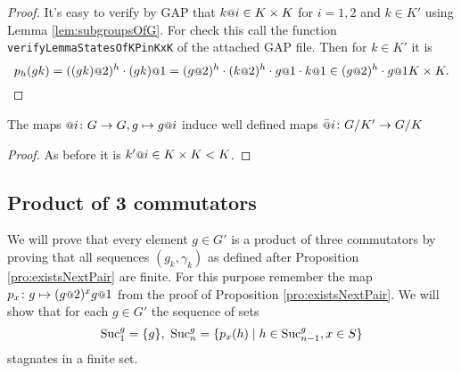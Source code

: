 \documentclass[a4paper,11pt]{amsart}
\begin{document}
\begin{proof}
 It's easy to verify by GAP that $k\at{i} \in K\times K$ for $i=1,2$ and $k\in K'$ using Lemma \ref{lem:subgroupsOfG}.
 For check this call the function \lstinline{verifyLemmaStatesOfKPinKxK} of the attached GAP file.
 Then for $k\in K'$ it is 
 \[p_h(gk) = ((gk)\at{2})^h\cdot (gk)\at{1} = (g\at{2})^h\cdot (k\at{2})^h\cdot g\at{1}\cdot k\at{1}\in (g\at{2})^h\cdot g\at{1}K\times K.\]
\end{proof}
\begin{lem} \label{lem:atIsWellDefinedModK'}
 The maps $\at{i}\colon G\to G, g\mapsto g\at{i}$ induce well defined maps $\att{i}\colon \RNK{G}{K'}\to\RNK{G}{K}$
\end{lem}
\begin{proof}
 As before it is $k'\at{i} \in K\times K < K$.
%  
%  
% 
\end{proof}
\subsection{Product of 3 commutators}
We will prove that every element $g\in G'$ is a product of three commutators by proving that all
sequences $(g_k,\gamma_k)$ as defined after Proposition \ref{pro:existsNextPair} are finite.
For this purpose remember the map $p_x\colon g \mapsto (g\at{2})^x g\at{1}$ from the proof of Proposition \ref{pro:existsNextPair}.
We will show that for each $g\in G'$ the sequence of sets 
\[\textup{Suc}_1^g=\{g\},\ \textup{Suc}_n^g = \{p_x(h) \mid h\in \textup{Suc}_{n-1}^g, x\in S\} \]
stagnates in a finite set. 
\end{document}
